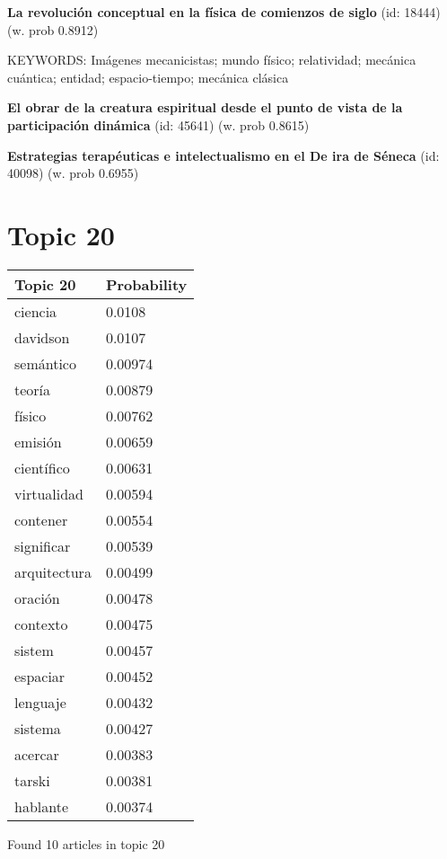\documentclass{article}
\begin{document}
\textbf{La revolución conceptual en la física de comienzos de siglo} (id: 18444)
 (w. prob 0.8912)


KEYWORDS:
Imágenes mecanicistas; mundo físico; relatividad; mecánica cuántica; entidad; espacio-tiempo; mecánica clásica
\vfill

\textbf{El obrar de la creatura espiritual desde el punto de vista de la participación dinámica} (id: 45641)
 (w. prob 0.8615)
\vfill

\textbf{Estrategias terapéuticas e intelectualismo en el De ira de Séneca} (id: 40098)
 (w. prob 0.6955)

\vfill
\newpage


\centering
\thispagestyle{empty}
\section*{Topic 20}\vfill
\begin{tabular}{ll}
\toprule
     Topic 20 & Probability \\
\midrule
      ciencia &      0.0108 \\
     davidson &      0.0107 \\
    semántico &     0.00974 \\
       teoría &     0.00879 \\
       físico &     0.00762 \\
      emisión &     0.00659 \\
   científico &     0.00631 \\
  virtualidad &     0.00594 \\
     contener &     0.00554 \\
   significar &     0.00539 \\
 arquitectura &     0.00499 \\
      oración &     0.00478 \\
     contexto &     0.00475 \\
       sistem &     0.00457 \\
     espaciar &     0.00452 \\
     lenguaje &     0.00432 \\
      sistema &     0.00427 \\
      acercar &     0.00383 \\
       tarski &     0.00381 \\
     hablante &     0.00374 \\
\bottomrule
\end{tabular}

\vfill
Found 10 articles in topic 20
\vfill
\end{document}
